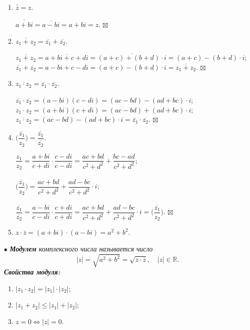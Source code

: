 \documentclass[a4paper, 12pt]{article}
\newenvironment{Proof}
{\par\noindent{$\blacklozenge$}}
{\hfill$\scriptstyle\boxtimes$}
\newcommand{\R}{\mathbb{R}}
\renewcommand{\leq}{\leqslant}
\begin{document}
\begin{enumerate}
    \item $\overline{\overline{z}}=z$.
    \begin{Proof}
        $\overline{\overline{a+bi}} = \overline{a-bi} = a+bi = z$.
    \end{Proof}
    \item $\overline{z_1+z_2} = \overline{z_1}+\overline{z_2}$.
    \begin{Proof}
        $\overline{z_1+z_2}=\overline{a+bi+c+di}=\overline{(a+c)+(b+d)\cdot i} = (a+c)-(b+d)\cdot i$;\\
        $\overline{z_1}+\overline{z_2}=a-bi+c-di=(a+c)-(b+d)\cdot i=\overline{z_1+z_2}.$
    \end{Proof}
    \item $\overline{z_1 \cdot z_2}=\overline{z_1}\cdot\overline{z_2}$.
    \begin{Proof}
        $\overline{z_1}\cdot\overline{z_2}=(a-bi)(c-di)=(ac-bd)-(ad+bc)\cdot i$;\\
        $z_1\cdot z_2=(a+bi)(c+di)=(ac-bd)+(ad+bc)\cdot i$;\\
        $\overline{z_1\cdot z_2} = (ac-bd)-(ad+bc)\cdot i = \overline{z_1}\cdot\overline{z_2}.$
    \end{Proof}
    \item $\overline{\Big(\dfrac{z_1}{z_2}\Big)} = \dfrac{\overline{z_1}}{\overline{z_2}}.$
    \begin{Proof}
        $\dfrac{z_1}{z_2}=\dfrac{a+bi}{c+di}\cdot \dfrac{c-di}{c-di}=\dfrac{ac+bd}{c^2+d^2}+\dfrac{bc-ad}{c^2+d^2}$;\\\\
        $\overline{\Big(\dfrac{z_1}{z_2}\Big)}=\dfrac{ac+bd}{c^2+d^2}+\dfrac{ad-bc}{c^2+d^2}\cdot i$;\\\\
        $\dfrac{\overline{z_1}}{\overline{z_2}}=\dfrac{a-bi}{c-di} \cdot \dfrac{c+di}{c+di} = \dfrac{ac+bd}{c^2+d^2}+\dfrac{ad-bc}{c^2+d^2}\cdot i = \overline{\Big(\dfrac{z_1}{z_2}\Big)}.$
    \end{Proof}
    \item $z\cdot \overline{z} = (a+bi)\cdot (a-bi)=a^2+b^2.$
\end{enumerate}
$\bullet$ \textit{\textbf{Модулем} комплексного числа называется число}
$$|z|=\sqrt{a^2+b^2}=\sqrt{z\cdot\overline{z}}, \quad |z| \in \R.$$
\textit{\textbf{Свойства модуля:}}
\begin{enumerate}
    \item $|z_1\cdot z_2|=|z_1|\cdot |z_2|$;
    \item $|z_1+z_2| \leq |z_1| + |z_2|$;
    \item $z=0 \Longleftrightarrow |z|=0$.
\end{enumerate}
\end{document}
